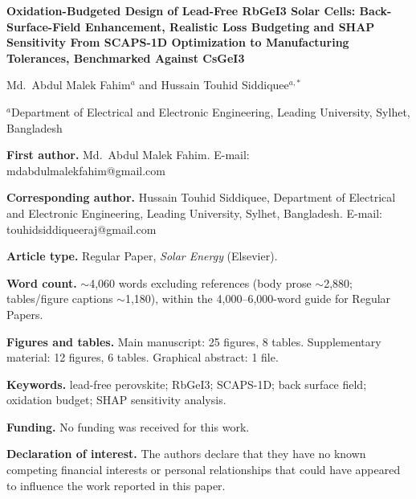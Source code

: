 \documentclass[12pt]{article}
\begin{document}
\begin{center}
{\large\bfseries Oxidation-Budgeted Design of Lead-Free RbGeI3 Solar Cells: Back-Surface-Field Enhancement, Realistic Loss Budgeting and SHAP Sensitivity From SCAPS-1D Optimization to Manufacturing Tolerances, Benchmarked Against CsGeI3\par}
\vspace{1.2em}
Md.\ Abdul Malek Fahim$^{a}$ and Hussain Touhid Siddiquee$^{a,*}$\par
\vspace{0.6em}
$^{a}$Department of Electrical and Electronic Engineering, Leading University, Sylhet, Bangladesh\par
\end{center}
\vspace{1em}
\noindent\textbf{First author.} Md.\ Abdul Malek Fahim. E-mail: mdabdulmalekfahim@gmail.com
\vspace{1em}

\noindent\textbf{Corresponding author.} Hussain Touhid Siddiquee, Department of Electrical and Electronic Engineering, Leading University, Sylhet, Bangladesh. E-mail: touhidsiddiqueeraj@gmail.com
\vspace{1em}

\noindent\textbf{Article type.} Regular Paper, \textit{Solar Energy} (Elsevier).
\vspace{1em}

\noindent\textbf{Word count.} $\sim$4,060 words excluding references (body prose $\sim$2,880; tables/figure captions $\sim$1,180), within the 4,000--6,000-word guide for Regular Papers.
\vspace{1em}

\noindent\textbf{Figures and tables.} Main manuscript: 25 figures, 8 tables. Supplementary material: 12 figures, 6 tables. Graphical abstract: 1 file.
\vspace{1em}

\noindent\textbf{Keywords.} lead-free perovskite; RbGeI3; SCAPS-1D; back surface field; oxidation budget; SHAP sensitivity analysis.
\vspace{1em}

\noindent\textbf{Funding.} No funding was received for this work.
\vspace{1em}

\noindent\textbf{Declaration of interest.} The authors declare that they have no known competing financial interests or personal relationships that could have appeared to influence the work reported in this paper.
\end{document}
